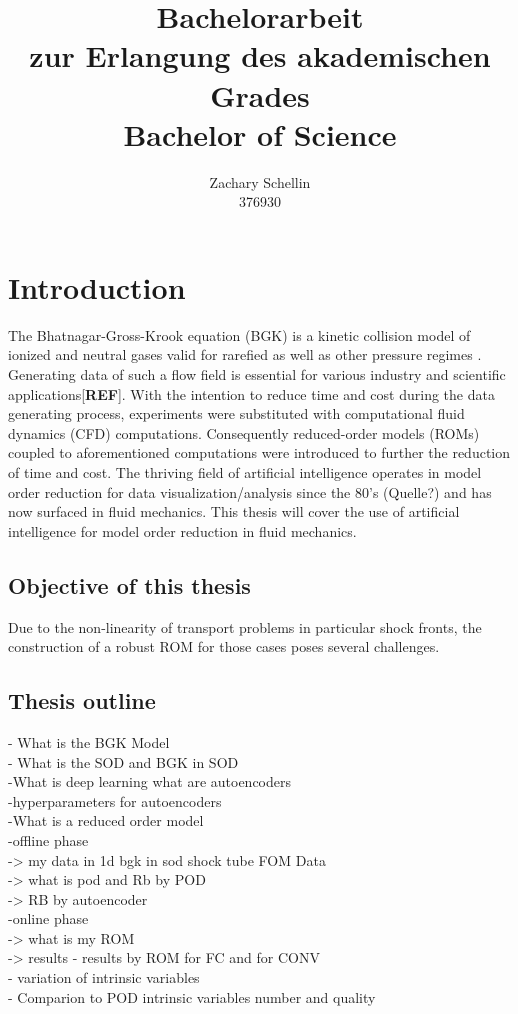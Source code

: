 \documentclass[12pt, a4paper]{article}
\begin{document}
\title{Bachelorarbeit\\ zur Erlangung des akademischen Grades\\ Bachelor of Science}
\author{Zachary Schellin\\376930}
\noindent
\maketitle
\newpage
\tableofcontents
\newpage
\section{Introduction}
The Bhatnagar-Gross-Krook equation (BGK) is a kinetic collision model of ionized and neutral gases valid for rarefied as well as other pressure regimes \cite{BGK}. Generating data of such a flow field is essential for various industry and scientific applications[\textbf{REF}]. With the intention to reduce time and cost during the data generating process, experiments were substituted with computational fluid dynamics (CFD) computations. Consequently reduced-order models (ROMs) coupled to aforementioned computations were introduced to further the reduction of time and cost. The thriving field of artificial intelligence operates in model order reduction for data visualization/analysis since the 80's (Quelle?)  and has now surfaced in fluid mechanics. This thesis will cover the use of artificial intelligence for model order reduction in fluid mechanics.
\subsection{Objective of this thesis}
Due to the non-linearity of transport problems in particular shock fronts, the construction of a robust ROM for those cases poses several challenges. 
\subsection{Thesis outline}
- What is the BGK Model\\
- What is the SOD and BGK in SOD\\
-What is deep learning what are autoencoders\\
-hyperparameters for autoencoders\\
-What is a reduced order model \\
-offline phase \\
-> my data in 1d bgk in sod shock tube FOM Data\\
-> what is pod and Rb by POD \\
-> RB by autoencoder \\
-online phase\\
-> what is my ROM \\
-> results - results by ROM for FC and for CONV \\
- variation of intrinsic variables \\
- Comparion to POD intrinsic variables number and quality \\
\end{document}
